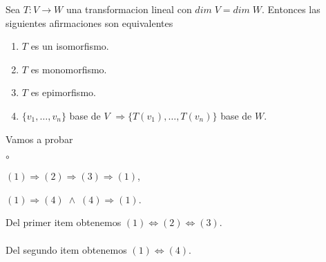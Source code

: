 \documentclass{article}
\theoremstyle{definition}
\theoremstyle{definition}
\theoremstyle{remark}
\begin{document}
 \begin{teo}
 Sea $T : V \to W$ una transformacion lineal con $dim \; V = dim \; W$. Entonces las siguientes afirmaciones son equivalentes \begin{enumerate}[label=(\arabic*)]
   \item $T$ es un isomorfismo. 
   \item $T$ es monomorfismo. 
   \item $T$ es epimorfismo. 
   \item $\{v_1, \dots , v_n\}$ base de $V$ $\Rightarrow \{T(v_1), \dots ,T(v_n)\}$ base de $W$.
   \end{enumerate}
 \end{teo}
 Vamos a probar \begin{list}{$\circ$}{}  
\item $(1)\Rightarrow(2) \Rightarrow (3) \Rightarrow (1)$, 
\item $(1) \Rightarrow (4) \; \land \; (4) \Rightarrow (1)$.
\end{list}
Del primer item obtenemos $(1) \Leftrightarrow (2) \Leftrightarrow (3)$. \\\\ Del segundo item obtenemos $(1) \Leftrightarrow (4)$.
\\
\end{document}
